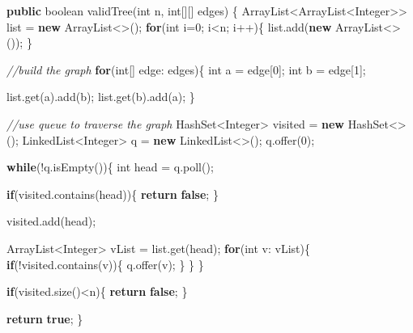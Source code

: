 \documentclass[]{book}
\newenvironment{Shaded}{\begin{snugshade}}{\end{snugshade}}
\newcommand{\BuiltInTok}[1]{#1}
\newcommand{\CommentTok}[1]{\textcolor[rgb]{0.56,0.35,0.01}{\textit{#1}}}
\newcommand{\DataTypeTok}[1]{\textcolor[rgb]{0.13,0.29,0.53}{#1}}
\newcommand{\DecValTok}[1]{\textcolor[rgb]{0.00,0.00,0.81}{#1}}
\newcommand{\FunctionTok}[1]{\textcolor[rgb]{0.00,0.00,0.00}{#1}}
\newcommand{\KeywordTok}[1]{\textcolor[rgb]{0.13,0.29,0.53}{\textbf{#1}}}
\newcommand{\NormalTok}[1]{#1}
\begin{document}
\begin{Shaded}
\begin{Highlighting}[]
\KeywordTok{public} \DataTypeTok{boolean} \FunctionTok{validTree}\NormalTok{(}\DataTypeTok{int}\NormalTok{ n, }\DataTypeTok{int}\NormalTok{[][] edges) \{}
    \BuiltInTok{ArrayList}\NormalTok{<}\BuiltInTok{ArrayList}\NormalTok{<}\BuiltInTok{Integer}\NormalTok{>> list = }\KeywordTok{new} \BuiltInTok{ArrayList}\NormalTok{<>();}
        \KeywordTok{for}\NormalTok{(}\DataTypeTok{int}\NormalTok{ i=}\DecValTok{0}\NormalTok{; i<n; i++)\{}
\NormalTok{        list.}\FunctionTok{add}\NormalTok{(}\KeywordTok{new} \BuiltInTok{ArrayList}\NormalTok{<>());}
\NormalTok{    \}}

    \CommentTok{//build the graph}
    \KeywordTok{for}\NormalTok{(}\DataTypeTok{int}\NormalTok{[] edge: edges)\{}
        \DataTypeTok{int}\NormalTok{ a = edge[}\DecValTok{0}\NormalTok{];}
        \DataTypeTok{int}\NormalTok{ b = edge[}\DecValTok{1}\NormalTok{];}

\NormalTok{        list.}\FunctionTok{get}\NormalTok{(a).}\FunctionTok{add}\NormalTok{(b);}
\NormalTok{        list.}\FunctionTok{get}\NormalTok{(b).}\FunctionTok{add}\NormalTok{(a);}
\NormalTok{    \}}

    \CommentTok{//use queue to traverse the graph}
    \BuiltInTok{HashSet}\NormalTok{<}\BuiltInTok{Integer}\NormalTok{> visited = }\KeywordTok{new} \BuiltInTok{HashSet}\NormalTok{<>();}
    \BuiltInTok{LinkedList}\NormalTok{<}\BuiltInTok{Integer}\NormalTok{> q = }\KeywordTok{new} \BuiltInTok{LinkedList}\NormalTok{<>();}
\NormalTok{    q.}\FunctionTok{offer}\NormalTok{(}\DecValTok{0}\NormalTok{);}

    \KeywordTok{while}\NormalTok{(!q.}\FunctionTok{isEmpty}\NormalTok{())\{}
        \DataTypeTok{int}\NormalTok{ head = q.}\FunctionTok{poll}\NormalTok{();}

        \KeywordTok{if}\NormalTok{(visited.}\FunctionTok{contains}\NormalTok{(head))\{}
            \KeywordTok{return} \KeywordTok{false}\NormalTok{;}
\NormalTok{        \}}

\NormalTok{        visited.}\FunctionTok{add}\NormalTok{(head);}

        \BuiltInTok{ArrayList}\NormalTok{<}\BuiltInTok{Integer}\NormalTok{> vList = list.}\FunctionTok{get}\NormalTok{(head);}
        \KeywordTok{for}\NormalTok{(}\DataTypeTok{int}\NormalTok{ v: vList)\{}
            \KeywordTok{if}\NormalTok{(!visited.}\FunctionTok{contains}\NormalTok{(v))\{}
\NormalTok{                q.}\FunctionTok{offer}\NormalTok{(v);}
\NormalTok{            \}}
\NormalTok{        \}}
\NormalTok{    \}}

    \KeywordTok{if}\NormalTok{(visited.}\FunctionTok{size}\NormalTok{()<n)\{}
        \KeywordTok{return} \KeywordTok{false}\NormalTok{;}
\NormalTok{    \}}

    \KeywordTok{return} \KeywordTok{true}\NormalTok{;}
\NormalTok{\}}
\end{Highlighting}
\end{Shaded}
\end{document}
